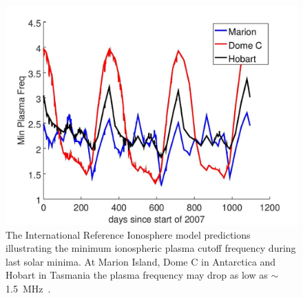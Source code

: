 \begin{figure}
	\centering
	\includegraphics[width=\linewidth]{Figures/IRI_model}
	\caption{The International Reference Ionosphere model predictions illustrating the minimum ionospheric plasma cutoff frequency during last solar minima. At Marion Island, Dome C in Antarctica and Hobart in Tasmania the plasma frequency may drop as low as $\sim$\SI{1.5}{\mega\hertz}~\citep{2020arXiv200812208C}.}
	\label{fig:IRI_model}
\end{figure}
